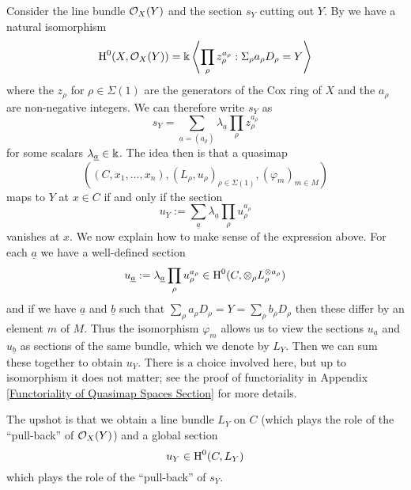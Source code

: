 Consider the line bundle $\mathcal{O}_X(Y)$ and the section $s_Y$ cutting out $Y$. By \cite{CoxRing} we have a natural isomorphism
\begin{equation*} \operatorname{H}^0(X,\mathcal{O}_X(Y)) = \Bbbk \left\langle \prod_{\rho} z_\rho^{a_\rho} : \Sigma_\rho a_\rho D_\rho = Y \right\rangle \end{equation*}
where the $z_\rho$ for $\rho \in \Sigma(1)$ are the generators of the Cox ring of $X$ and the $a_\rho$ are non-negative integers. We can therefore write $s_Y$ as
\begin{equation*} s_Y = \sum_{\underline{a}=(a_\rho)} \lambda_{\underline{a}} \prod_\rho z_\rho^{a_\rho} \end{equation*}
for some scalars $\lambda_{\underline{a}} \in \Bbbk$. The idea then is that a quasimap
\begin{equation*} ((C,x_1,\ldots,x_n), (L_\rho,u_\rho)_{\rho \in \Sigma(1)}, (\varphi_m)_{m \in M}) \end{equation*}
maps to $Y$ at $x \in C$ if and only if the section
\begin{equation*} u_Y := \sum_{\underline{a}} \lambda_{\underline{a}} \prod_\rho u_\rho^{a_\rho} \end{equation*}
vanishes at $x$. We now explain how to make sense of the expression above. For each $\underline{a}$ we have a well-defined section
\begin{equation*} u_{\underline{a}} := \lambda_{\underline{a}} \prod_\rho u_\rho^{a_\rho} \in \operatorname{H}^0(C,\otimes_\rho L_\rho^{\otimes a_\rho}) \end{equation*}
and if we have $\underline{a}$ and $\underline{b}$ such that $\sum_\rho a_\rho D_\rho = Y = \sum_\rho b_\rho D_\rho$ then these differ by an element $m$ of $M$. Thus the isomorphism $\varphi_m$ allows us to view the sections $u_{\underline{a}}$ and $u_{\underline{b}}$ as sections of the same bundle, which we denote by $L_Y$. Then we can sum these together to obtain $u_Y$. There is a choice involved here, but up to isomorphism it does not matter; see the proof of functoriality in Appendix \ref{Functoriality of Quasimap Spaces Section} for more details.

The upshot is that we obtain a line bundle $L_Y$ on $C$ (which plays the role of the ``pull-back'' of $\mathcal{O}_X(Y)$) and a global section
\begin{equation*} u_Y \in \operatorname{H}^0(C,L_Y) \end{equation*}
which plays the role of the ``pull-back'' of $s_Y$.

